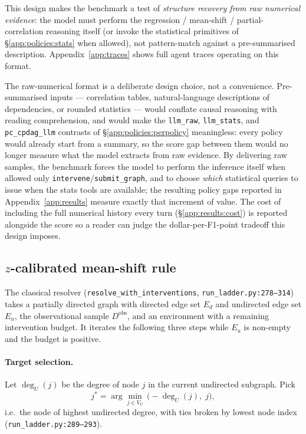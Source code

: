 This design makes the benchmark a test of \emph{structure recovery from raw numerical evidence}: the model must perform the regression / mean-shift / partial-correlation reasoning itself (or invoke the statistical primitives of §\ref{app:policies:stats} when allowed), not pattern-match against a pre-summarised description. Appendix~\ref{app:traces} shows full agent traces operating on this format.

The raw-numerical format is a deliberate design choice, not a convenience. Pre-summarised inputs --- correlation tables, natural-language descriptions of dependencies, or rounded statistics --- would conflate causal reasoning with reading comprehension, and would make the \texttt{llm\_raw}, \texttt{llm\_stats}, and \texttt{pc\_cpdag\_llm} contrasts of §\ref{app:policies:perpolicy} meaningless: every policy would already start from a summary, so the score gap between them would no longer measure what the model extracts from raw evidence. By delivering raw samples, the benchmark forces the model to perform the inference itself when allowed only \texttt{intervene}/\texttt{submit\_graph}, and to choose \emph{which} statistical queries to issue when the stats tools are available; the resulting policy gaps reported in Appendix~\ref{app:results} measure exactly that increment of value. The cost of including the full numerical history every turn (§\ref{app:results:cost}) is reported alongside the score so a reader can judge the dollar-per-F1-point tradeoff this design imposes.

\subsection{\texorpdfstring{$z$-calibrated mean-shift rule}{z-calibrated mean-shift rule}}
\label{app:policies:zrule}

The classical resolver (\texttt{resolve\_with\_interventions}, \texttt{run\_ladder.py:278--314}) takes a partially directed graph with directed edge set $E_d$ and undirected edge set $E_u$, the observational sample $D^{\text{obs}}$, and an environment with a remaining intervention budget. It iterates the following three steps while $E_u$ is non-empty and the budget is positive.

\paragraph{Target selection.} Let $\deg_U(j)$ be the degree of node $j$ in the current undirected subgraph. Pick
\begin{equation}
j^* = \arg\min_{j \in V_U}\, \bigl(-\deg_U(j),\; j\bigr),
\end{equation}
i.e.\ the node of highest undirected degree, with ties broken by lowest node index (\texttt{run\_ladder.py:289--293}).

